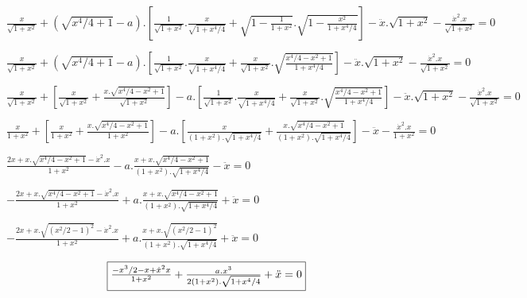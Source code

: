 \documentclass[10pt,a4paper]{article}
\begin{document}
$\frac{x}{\sqrt{1+x^2}} + (\sqrt{x^4/4+1}-a).[\frac{1}{\sqrt{1+x^2}}.\frac{x}{\sqrt{1+x^4/4}} + \sqrt{1-\frac{1}{1+x^2}}.\sqrt{1-\frac{x^2}{1+x^4/4}}] - \ddot{x}.\sqrt{1+x^2} - \frac{\dot{x}^2.x}{\sqrt{1+x^2}} = 0$
  
$\frac{x}{\sqrt{1+x^2}} + (\sqrt{x^4/4+1}-a).[\frac{1}{\sqrt{1+x^2}}.\frac{x}{\sqrt{1+x^4/4}} + \frac{x}{\sqrt{1+x^2}}.\sqrt{\frac{x^4/4-x^2+1}{1+x^4/4}}] - \ddot{x}.\sqrt{1+x^2} - \frac{\dot{x}^2.x}{\sqrt{1+x^2}} = 0$
  
$\frac{x}{\sqrt{1+x^2}} + [\frac{x}{\sqrt{1+x^2}} + \frac{x.\sqrt{x^4/4-x^2+1}}{\sqrt{1+x^2}}] -a.[\frac{1}{\sqrt{1+x^2}}.\frac{x}{\sqrt{1+x^4/4}} + \frac{x}{\sqrt{1+x^2}}.\sqrt{\frac{x^4/4-x^2+1}{1+x^4/4}}] - \ddot{x}.\sqrt{1+x^2} - \frac{\dot{x}^2.x}{\sqrt{1+x^2}} = 0$
 
$\frac{x}{1+x^2} + [\frac{x}{1+x^2} + \frac{x.\sqrt{x^4/4-x^2+1}}{1+x^2}] -a.[\frac{x}{(1+x^2).\sqrt{1+x^4/4}} +\frac{x.\sqrt{x^4/4-x^2+1}}{(1+x^2).\sqrt{1+x^4/4}}] - \ddot{x} - \frac{\dot{x}^2.x}{1+x^2} = 0$

$\frac{2x+x.\sqrt{x^4/4-x^2+1}-\dot{x}^2.x}{1+x^2} -a.\frac{x+x.\sqrt{x^4/4-x^2+1}}{(1+x^2).\sqrt{1+x^4/4}} - \ddot{x}= 0$

$-\frac{2x+x.\sqrt{x^4/4-x^2+1}-\dot{x}^2.x}{1+x^2} +a.\frac{x+x.\sqrt{x^4/4-x^2+1}}{(1+x^2).\sqrt{1+x^4/4}} + \ddot{x}= 0$

$-\frac{2x+x.\sqrt{(x^2/2-1)^2}-\dot{x}^2.x}{1+x^2} +a.\frac{x+x.\sqrt{(x^2/2-1)^2}}{(1+x^2).\sqrt{1+x^4/4}} + \ddot{x}= 0$

\[ \fbox{$\frac{-x^3/2-x+\dot{x}^2x}{1+x^2} + \frac{a.x^3}{2(1+x^2).\sqrt{1+x^4/4}} + \ddot{x}= 0$} \]
  
  
\end{document}
